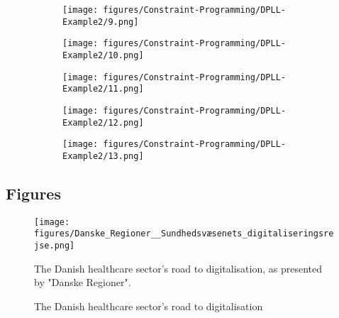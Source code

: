 \begin{figure}[H]
    \centering
    \begin{subfigure}[t]{0.48\textwidth}
        \centering
        \texttt{[image: figures/Constraint-Programming/DPLL-Example2/9.png]}
    \end{subfigure}
    \hfill
    \begin{subfigure}[t]{0.48\textwidth}
        \centering
        \texttt{[image: figures/Constraint-Programming/DPLL-Example2/10.png]}
    \end{subfigure}
\end{figure}

\begin{figure}[H]
    \centering
    \begin{subfigure}[t]{0.48\textwidth}
        \centering
        \texttt{[image: figures/Constraint-Programming/DPLL-Example2/11.png]}
    \end{subfigure}
    \hfill
    \begin{subfigure}[t]{0.48\textwidth}
        \centering
        \texttt{[image: figures/Constraint-Programming/DPLL-Example2/12.png]}
    \end{subfigure}
\end{figure}

\begin{figure}[H]
    \centering
    \begin{subfigure}[t]{0.48\textwidth}
        \centering
        \texttt{[image: figures/Constraint-Programming/DPLL-Example2/13.png]}
    \end{subfigure}
\end{figure}


\subsection{Figures}
\begin{figure}[H]
    \centering
    \texttt{[image: figures/Danske\_Regioner\_\_Sundhedsvæsenets\_digitaliseringsrejse.png]}
    \caption{The Danish healthcare sector's road to digitalisation}
    \medskip
    \small
    \raggedright
    The Danish healthcare sector's road to digitalisation, as presented by "Danske Regioner"\cite{Den-Reg-digitalisation}.
    \label{fig:healthcare_digitalisation}
\end{figure}

